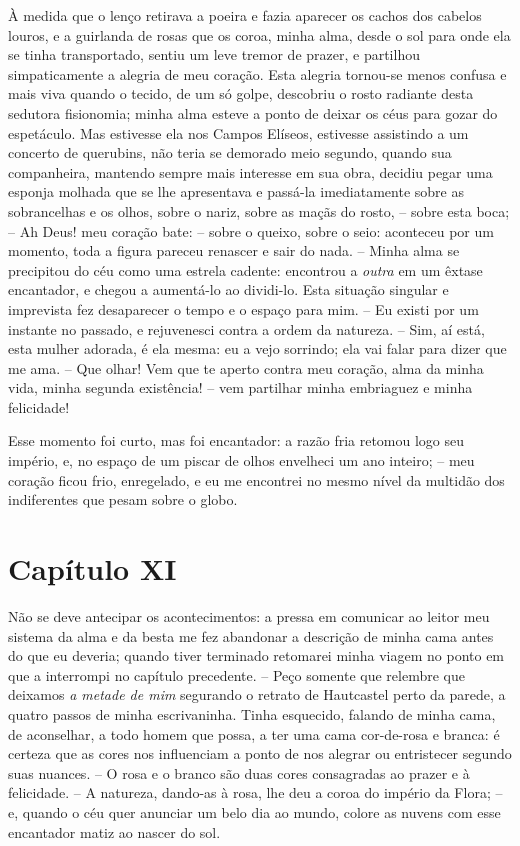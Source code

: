  À medida que o lenço retirava a poeira e fazia aparecer os cachos dos
cabelos louros, e a guirlanda de rosas que os coroa, minha alma, desde
o sol para onde ela se tinha transportado, sentiu um leve tremor de
prazer, e partilhou simpaticamente a alegria de meu coração. Esta
alegria tornou-se menos confusa e mais viva quando o tecido, de um só
golpe, descobriu o rosto radiante desta sedutora fisionomia; minha alma
esteve a ponto de deixar os céus para gozar do espetáculo. Mas
estivesse ela nos Campos Elíseos, estivesse assistindo a um concerto de
querubins, não teria se demorado meio segundo, quando sua companheira,
mantendo sempre mais interesse em sua obra, decidiu pegar uma esponja
molhada que se lhe apresentava e passá-la imediatamente sobre as
sobrancelhas e os olhos, sobre o nariz, sobre as maçãs do rosto, --
sobre esta boca; -- Ah Deus! meu coração bate: -- sobre o queixo,
sobre o seio: aconteceu por um momento, toda a figura pareceu renascer
e sair do nada. -- Minha alma se precipitou do céu como uma estrela
cadente: encontrou a \textit{outra} em um êxtase encantador, e chegou a
aumentá-lo ao dividi-lo. Esta situação singular e imprevista fez
desaparecer o tempo e o espaço para mim. -- Eu existi por um instante
no passado, e rejuvenesci contra a ordem da natureza. -- Sim, aí está,
esta mulher adorada, é ela mesma: eu a vejo sorrindo; ela vai falar
para dizer que me ama. -- Que olhar! Vem que te aperto contra meu
coração, alma da minha vida, minha segunda existência! -- vem
partilhar minha embriaguez e minha felicidade!

 Esse momento foi curto, mas foi encantador: a razão fria retomou logo
seu império, e, no espaço de um piscar de olhos envelheci um ano
inteiro; -- meu coração ficou frio, enregelado, e eu me encontrei no
mesmo nível da multidão dos indiferentes que pesam sobre o globo.

\section*{Capítulo XI}

 Não se deve antecipar os acontecimentos: a pressa em comunicar ao
leitor meu sistema da alma e da besta me fez abandonar a descrição de
minha cama antes do que eu deveria; quando tiver terminado retomarei
minha viagem no ponto em que a interrompi no capítulo precedente. --
Peço somente que relembre que deixamos \textit{a metade de mim}
segurando o retrato de Hautcastel perto da parede, a quatro passos de
minha escrivaninha. Tinha esquecido, falando de minha cama, de
aconselhar, a todo homem que possa, a ter uma cama cor-de-rosa e
branca: é certeza que as cores nos influenciam a ponto de nos alegrar
ou entristecer segundo suas nuances. -- O rosa e o branco são duas
cores consagradas ao prazer e à felicidade. -- A natureza, dando-as à
rosa, lhe deu a coroa do império da Flora; -- e, quando o céu quer
anunciar um belo dia ao mundo, colore as nuvens com esse encantador
matiz ao nascer do sol.


